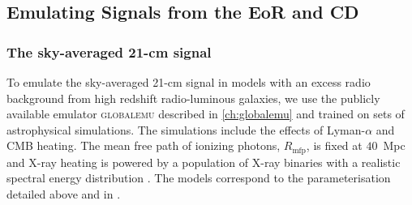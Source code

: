 

\subsection{Emulating Signals from the EoR and CD}


\subsubsection{The sky-averaged 21-cm signal}

To emulate the sky-averaged 21-cm signal in models with an excess radio background from high redshift radio-luminous galaxies, we use the publicly available emulator \textsc{globalemu} described in \cref{ch:globalemu} and \cite{Bevins_globalemu_2021} trained on sets of astrophysical simulations. The simulations include the effects of Lyman-$\alpha$ and CMB heating. The mean free path of ionizing photons, $R_\mathrm{mfp}$, is fixed at $40$~Mpc and X-ray heating is powered by a population of X-ray binaries with a realistic spectral energy distribution \cite{fialkov_observable_2014}. The models correspond to the parameterisation detailed above and in \cite{Reis2020}.

